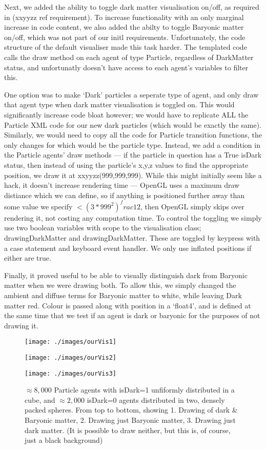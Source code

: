\documentclass[11pt,a4paper]{article}
\begin{document}
Next, we added the ability to toggle dark matter visualisation on/off, as required in (xxyyzz ref requirement). To increase functionality with an only marginal increase in code content, we also added the abilty to toggle Baryonic matter on/off, which was not part of our initl requirements. Unfortunately, the code structure of the default visualiser made this task harder. The templated code calls the draw method on each agent of type Particle, regardless of DarkMatter status, and unfortunatly doesn't have access to each agent's variables to filter this. 

One option was to make `Dark' particles a seperate type of agent, and only draw that agent type when dark matter visualisation is toggled on. This would significantly increase code bloat however; we would have to replicate ALL the Particle XML code for our new dark particles (which would be exactly the same). Similarly, we would need to copy all the code for Particle transition functions, the only changes for which would be the particle type. Instead, we add a condition in the Particle agents' draw methods --- if the particle in question has a True isDark status, then instead of using the particle's x,y,z values to find the appropriate position, we draw it at xxyyzz(999,999,999). While this might initially seem like a hack, it doesn't increase rendering time --- OpenGL uses a maximum draw distiance which we can define, so if anything is positioned further away than some value we specify $<(3*999^2)^frac{1}{2}$, then OpenGL simply skips over rendering it, not costing any computation time. To control the toggling we simply use two boolean variables with scope to the visualisation class; drawingDarkMatter and drawingDarkMatter. These are toggled by keypress with a case statement and keyboard event handler. We only use inflated positions if either are true.

Finally, it proved useful to be able to visually distinguish dark from Baryonic matter when we were drawing both. To allow this, we simply changed the ambient and diffuse terms for Baryonic matter to white, while leaving Dark matter red. Colour is passed along with position in a `float4', and is defined at the same time that we test if an agent is dark or baryonic for the purposes of not drawing it.

\begin{figure}[H]
\texttt{[image: ./images/ourVis1]}
\end{figure}
\begin{figure}[H]
\texttt{[image: ./images/ourVis2]}
\end{figure}
\begin{figure}[H]
\texttt{[image: ./images/ourVis3]}
\caption[Our visualisation modes]{$\approx 8,000$ Particle agents with isDark=1 unfiformly distributed in a cube, and $\approx 2,000$ isDark=0 agents distributed in two, densely packed spheres. From top to bottom, showing 1. Drawing of dark \& Baryonic matter, 2. Drawing just Baryonic matter, 3. Drawing just dark matter. (It is possible to draw neither, but this is, of course, just a black background)}
\end{figure}
\end{document}
